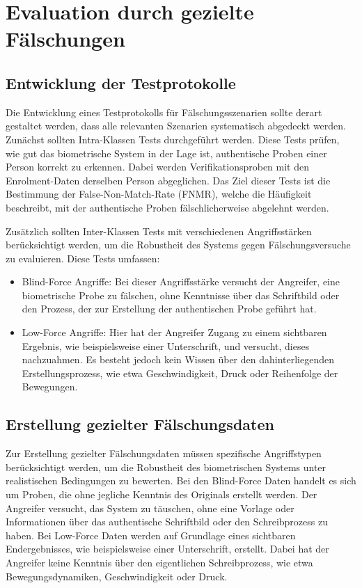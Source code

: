 \documentclass{article}
\begin{document}
\section{Evaluation durch gezielte Fälschungen}

\subsection{Entwicklung der Testprotokolle}

Die Entwicklung eines Testprotokolls für Fälschungsszenarien sollte derart gestaltet werden, dass alle 
relevanten Szenarien systematisch abgedeckt werden. Zunächst sollten Intra-Klassen Tests durchgeführt 
werden. Diese Tests prüfen, wie gut das biometrische System in der Lage ist, authentische Proben einer 
Person korrekt zu erkennen. Dabei werden Verifikationsproben mit den Enrolment-Daten derselben Person 
abgeglichen. Das Ziel dieser Tests ist die Bestimmung der False-Non-Match-Rate (FNMR), welche die 
Häufigkeit beschreibt, mit der authentische Proben fälschlicherweise abgelehnt werden.

Zusätzlich sollten Inter-Klassen Tests mit verschiedenen Angriffsstärken berücksichtigt werden, um die 
Robustheit des Systems gegen Fälschungsversuche zu evaluieren. Diese Tests umfassen:

\begin{itemize}
	\item Blind-Force Angriffe: Bei dieser Angriffsstärke versucht der Angreifer, eine biometrische Probe
		zu fälschen, ohne Kenntnisse über das Schriftbild oder den Prozess, der zur Erstellung der
		authentischen Probe geführt hat.
	\item Low-Force Angriffe: Hier hat der Angreifer Zugang zu einem sichtbaren Ergebnis, wie beispielsweise
		einer Unterschrift, und versucht, dieses nachzuahmen. Es besteht jedoch kein Wissen über den
		dahinterliegenden Erstellungsprozess, wie etwa Geschwindigkeit, Druck oder Reihenfolge der Bewegungen.
\end{itemize}

\subsection{Erstellung gezielter Fälschungsdaten}

Zur Erstellung gezielter Fälschungsdaten müssen spezifische Angriffstypen berücksichtigt werden, um die Robustheit 
des biometrischen Systems unter realistischen Bedingungen zu bewerten. Bei den Blind-Force Daten handelt es sich um Proben,
die ohne jegliche Kenntnis des Originals erstellt werden. Der Angreifer versucht, das System zu täuschen, ohne eine
Vorlage oder Informationen über das authentische Schriftbild oder den Schreibprozess zu haben. Bei Low-Force Daten werden
auf Grundlage eines sichtbaren Endergebnisses, wie beispielsweise einer Unterschrift, erstellt. Dabei hat der Angreifer
keine Kenntnis über den eigentlichen Schreibprozess, wie etwa Bewegungsdynamiken, Geschwindigkeit oder Druck.
\end{document}
